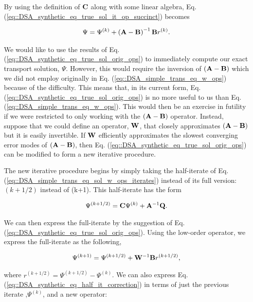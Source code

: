 \noindent By using the definition of ${\bf C}$ along with some linear algebra, Eq. (\ref{eq::DSA_synthetic_eq_true_sol_it_op_succinct}) becomes 

\begin{equation}
\label{eq::DSA_synthetic_eq_true_sol_orig_ops}
\Psi = \Psi^{(k)} + \left(  {\bf A} - {\bf B}   \right)^{-1} {\bf B} r^{(k)}.
\end{equation}

We would like to use the results of Eq. (\ref{eq::DSA_synthetic_eq_true_sol_orig_ops}) to immediately compute our exact transport solution, $\Psi$. However, this would require the inversion of $\left(  {\bf A} - {\bf B}  \right)$ which we did not employ originally in Eq. (\ref{eq::DSA_simple_trans_eq_w_ops}) because of the difficulty. This means that, in its current form, Eq. (\ref{eq::DSA_synthetic_eq_true_sol_orig_ops}) is no more useful to us than Eq. (\ref{eq::DSA_simple_trans_eq_w_ops}). This would then be an exercise in futility if we were restricted to only working with the $\left(  {\bf A} - {\bf B}  \right)$ operator. Instead, suppose that we could define an operator, ${\bf W}$, that closely approximates $\left(  {\bf A} - {\bf B}  \right)$ but it is easily invertible. If ${\bf W}$ efficiently approximates the slowest converging error modes of $\left(  {\bf A} - {\bf B}  \right)$, then Eq. (\ref{eq::DSA_synthetic_eq_true_sol_orig_ops}) can be modified to form a new iterative procedure.

The new iterative procedure begins by simply taking the half-iterate of Eq. (\ref{eq::DSA_simple_trans_eq_sol_w_ops_iterates}) instead of its full version: ${(k+1/2)}$ instead of {(k+1)}. This half-iterate has the form

\begin{equation}
\label{eq::DSA_synthetic_eq_half_it}
\Psi^{(k+1/2)} = {\bf C} \Psi^{(k)} + {\bf A}^{-1} {\bf Q}.
\end{equation}

\noindent We can then express the full-iterate by the suggestion of Eq. (\ref{eq::DSA_synthetic_eq_true_sol_orig_ops}). Using the low-order operator, we express the full-iterate as the following,

\begin{equation}
\label{eq::DSA_synthetic_eq_half_it_correction}
\Psi^{(k+1)} =\Psi^{(k+1/2)} + {\bf W}^{-1} {\bf B}  r^{(k+1/2)},
\end{equation}

\noindent where $r^{(k+1/2)} = \Psi^{(k+1/2)} - \Psi^{(k)}$. We can also express Eq. (\ref{eq::DSA_synthetic_eq_half_it_correction}) in terms of just the previous iterate ,$\Psi^{(k)}$, and a new operator:

